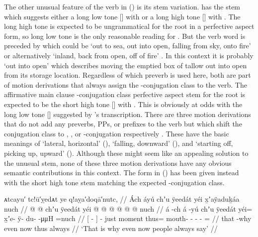 The other unusual feature of the verb in (\lastx) is its stem variation.
\citeauthor{swanton:1909} has the stem  which suggests either a long low tone  [] with  or a long high tone  [] with .
The long high tone  is expected to be ungrammatical for the root  in a perfective aspect form, so long low tone  is the only reasonable reading for .
But the verb word is preceded by  which could be  ‘out to sea, out into open, falling from sky, onto fire’ or alternatively  ‘inland, back from open, off of fire’ \parencite[297]{leer:1991}.
In this context it is probably  ‘out into open’ which describes moving the emptied box of tallow out into open from its storage location.
Regardless of which preverb is used here, both are part of motion derivations that always assign the -conjugation class to the verb.
The affirmative main clause -conjugation class perfective aspect stem for the root  is expected to be the short high tone  [] with .
This is obviously at odds with the long low tone  [] suggested by \citeauthor{swanton:1909}’s transcription.
There are three motion derivations that do not add any preverbs, PPs, or prefixes to the verb  but which shift the conjugation class to , , or -conjugation respectively \parencite[306, 308, 309]{leer:1991}.
These have the basic meanings of ‘lateral, horizontal’ (), ‘falling, downward’ (), and ‘starting off, picking up, upward’ ().
Although these might seem like an appealing solution to the unusual stem, none of these three motion derivations have any obvious semantic contributions in this context.
The form in (\lastx) has been given instead with the short high tone  stem matching the expected -conjugation class.

\ex\label{ex:92-20-ppl-always-say}%
%
\begingl
	\glpreamble	ᴀtcayu′ tc!ū′ỵedᴀt ye q!aỵa′doqā′nutc, //
	\glpreamble	Ách áyú chʼu ÿeedát yéi x̱ʼaÿaduḵáa nuch //
	\gla	{}  @ {} {}  @ {}
		chʼu ÿeedát
		yéi @  @ {} @ {} @ {} @ {} @ \•nuch //
	\glb	{} á -ch {} á -yú
		chʼu ÿeedát
		yéi= x̱ʼe- ÿ- du-  -μμH =nuch //
	\glc	{}[  - {}]  -
		just moment
		thus= mouth- - -  - = //
	\gld	{} that -why {}  {}
		even now
		thus  {} {} {} {} \•always //
	\glft	‘That is why even now people always say’
		//
\endgl
\xe


